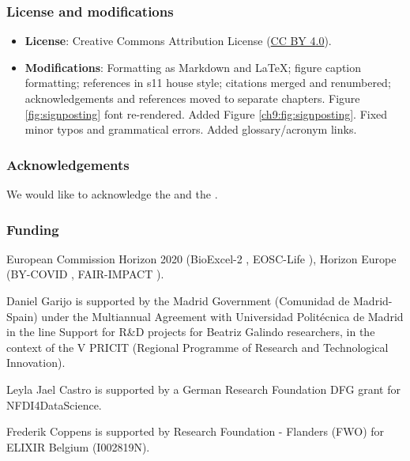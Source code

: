 \subsubsection*{License and modifications}

\begin{itemize}
\tightlist
\item
  \textbf{License}: Creative Commons Attribution License
  (\href{https://spdx.org/licenses/CC-BY-4.0}{CC BY 4.0}).
\item
  \textbf{Modifications}: Formatting as Markdown and LaTeX; figure caption
  formatting; references in s11 house style; citations merged and renumbered; 
  acknowledgements and references moved to separate chapters. 
  Figure \ref{fig:signposting} font re-rendered. Added Figure \ref{ch9:fig:signposting}. Fixed minor typos and grammatical errors.  Added glossary/acronym links.
\end{itemize}

\subsubsection*{Acknowledgements}

We would like to acknowledge the
 and the
.

\subsubsection*{Funding}

European Commission Horizon 2020 (BioExcel-2
, EOSC-Life
), Horizon
Europe (BY-COVID
,
FAIR-IMPACT
).

Daniel Garijo is supported by the Madrid Government (Comunidad de
Madrid-Spain) under the Multiannual Agreement with Universidad
Politécnica de Madrid in the line Support for R\&D projects for Beatriz
Galindo researchers, in the context of the V PRICIT (Regional Programme
of Research and Technological Innovation).

Leyla Jael Castro is supported by a German Research Foundation DFG grant
for NFDI4DataScience.

Frederik Coppens is supported by Research Foundation - Flanders (FWO)
for ELIXIR Belgium (I002819N).


